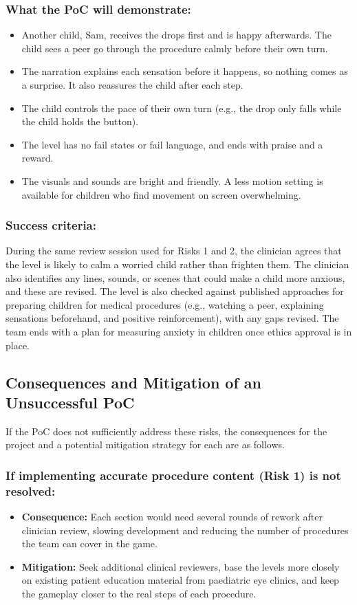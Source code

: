 \documentclass{article}
\begin{document}
\subsubsection*{What the PoC will demonstrate:}
\begin{itemize}
  \item Another child, Sam, receives the drops first and is happy afterwards.
  The child sees a peer go through the procedure calmly before their own turn.
  \item The narration explains each sensation before it happens, so nothing
  comes as a surprise. It also reassures the child after each step.
  \item The child controls the pace of their own turn (e.g., the drop only falls
  while the child holds the button).
  \item The level has no fail states or fail language, and ends with praise and
  a reward.
  \item The visuals and sounds are bright and friendly. A less motion setting
  is available for children who find movement on screen overwhelming.
\end{itemize}

\subsubsection*{Success criteria:}
During the same review session used for Risks 1 and 2, the clinician agrees
that the level is likely to calm a worried child rather than frighten them. The
clinician also identifies any lines, sounds, or scenes that could make a child
more anxious, and these are revised. The level is also checked against
published approaches for preparing children for medical procedures (e.g.,
watching a peer, explaining sensations beforehand, and positive reinforcement),
with any gaps revised. The team ends with a plan for measuring anxiety in
children once ethics approval is in place.

\subsection{Consequences and Mitigation of an Unsuccessful PoC}

If the PoC does not sufficiently address these risks, the consequences for the
project and a potential mitigation strategy for each are as follows.

\subsubsection*{If implementing accurate procedure content (Risk 1) is not resolved:}
\begin{itemize}
  \item \textbf{Consequence:} Each section would need several rounds of rework
  after clinician review, slowing development and reducing the number of
  procedures the team can cover in the game.
  \item \textbf{Mitigation:} Seek additional clinical reviewers, base the levels
  more closely on existing patient education material from paediatric eye
  clinics, and keep the gameplay closer to the real steps of each procedure.
\end{itemize}
\end{document}
